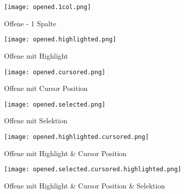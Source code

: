\begin{figure}[!htb]
    \centering
    \begin{minipage}[b]{0.45\textwidth}
        \centering
        \texttt{[image: opened.1col.png]}
        \caption{\centering Offene  - 1 Spalte}
        \label{img:openedOneColNewComp}
    \end{minipage}
    \hfill
    \begin{minipage}[b]{0.45\textwidth}
        \centering
        \texttt{[image: opened.highlighted.png]}
        \caption{\centering Offene  mit Highlight}
        \label{img:openedHighlightedNewComp}
    \end{minipage}
\end{figure}

\begin{figure}[!htb]
    \centering
    \begin{minipage}[b]{0.45\textwidth}
        \centering
        \texttt{[image: opened.cursored.png]}
        \caption{\centering Offene  mit Cursor Position}
        \label{img:openedCursoredNewComp}
    \end{minipage}
    \hfill
    \begin{minipage}[b]{0.45\textwidth}
        \centering
        \texttt{[image: opened.selected.png]}
        \caption{\centering Offene  mit Selektion}
        \label{img:openedSelectedNewComp}
    \end{minipage}
\end{figure}

\begin{figure}[!htb]
    \centering
    \begin{minipage}[b]{0.45\textwidth}
        \centering
        \texttt{[image: opened.highlighted.cursored.png]}
        \caption{\centering Offene  mit Highlight \& Cursor Position}
        \label{img:openedHighlightedCursoredNewComp}
    \end{minipage}
    \hfill
    \begin{minipage}[b]{0.45\textwidth}
        \centering
        \texttt{[image: opened.selected.cursored.highlighted.png]}
        \caption{\centering Offene  mit Highlight \& Cursor Position \& Selektion}
        \label{img:openedHighlightedCursoredSelectedNewComp}
    \end{minipage}
\end{figure}


